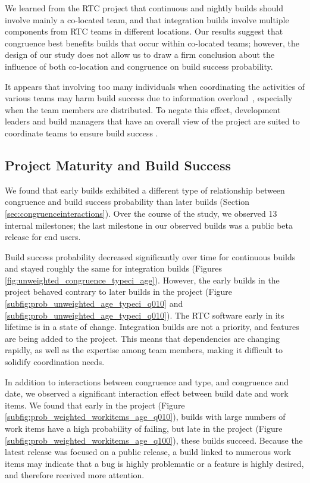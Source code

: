 We learned from the RTC project that continuous and nightly builds should involve mainly a co-located team, and that integration builds involve multiple components from RTC teams in different locations. Our results suggest that congruence best benefits builds that occur within co-located teams; however, the design of our study does not allow us to draw a firm conclusion about the influence of both co-location and congruence on build success probability.

It appears that involving too many individuals when coordinating the activities of various teams may harm build success due to information overload~\cite{damian:icgse:2007}, especially when the team members are distributed. To negate this effect, development leaders and build managers that have an overall view of the project are suited to coordinate teams to ensure build success \cite{hinds:cscw:2006}.


\subsection{Project Maturity and Build Success}
We found that early builds exhibited a different type of relationship between congruence and build success probability than later builds (Section \ref{sec:congruenceinteractions}). Over the course of the study, we observed 13 internal milestones; the last milestone in our observed builds was a public beta release for end users.

Build success probability decreased significantly over time for continuous builds and stayed roughly the same for integration builds (Figures \ref{fig:unweighted_congruence_typeci_age}).
However, the early builds in the project behaved contrary to later builds in the project (Figure \ref{subfig:prob_unweighted_age_typeci_q010} and \ref{subfig:prob_unweighted_age_typeci_q010}). The RTC software early in its lifetime is in a state of change. Integration builds are not a priority, and features are being added to the project. This means that dependencies are changing rapidly, as well as the expertise among team members, making it difficult to solidify coordination needs.

In addition to interactions between congruence and type, and congruence and date, we observed a significant interaction effect between build date and work items.
We found that early in the project (Figure \ref{subfig:prob_weighted_workitems_age_q010}), builds with large numbers of work items have a high probability of failing, but late in the project (Figure \ref{subfig:prob_weighted_workitems_age_q100}), these builds succeed. Because the latest release was focused on a public release, a build linked to numerous work items may indicate that a bug is highly problematic or a feature is highly desired, and therefore received more attention. 




